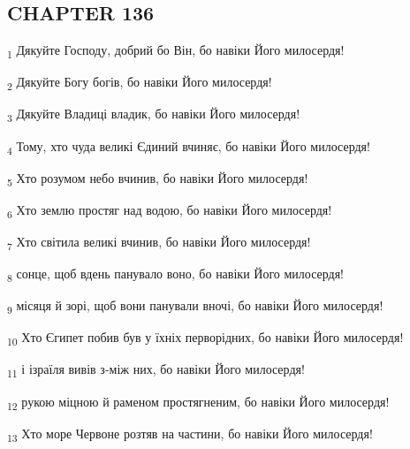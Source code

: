 \subsection{CHAPTER 136}
\begin{tcolorbox}
\textsubscript{1} Дякуйте Господу, добрий бо Він, бо навіки Його милосердя!
\end{tcolorbox}
\begin{tcolorbox}
\textsubscript{2} Дякуйте Богу богів, бо навіки Його милосердя!
\end{tcolorbox}
\begin{tcolorbox}
\textsubscript{3} Дякуйте Владиці владик, бо навіки Його милосердя!
\end{tcolorbox}
\begin{tcolorbox}
\textsubscript{4} Тому, хто чуда великі Єдиний вчиняє, бо навіки Його милосердя!
\end{tcolorbox}
\begin{tcolorbox}
\textsubscript{5} Хто розумом небо вчинив, бо навіки Його милосердя!
\end{tcolorbox}
\begin{tcolorbox}
\textsubscript{6} Хто землю простяг над водою, бо навіки Його милосердя!
\end{tcolorbox}
\begin{tcolorbox}
\textsubscript{7} Хто світила великі вчинив, бо навіки Його милосердя!
\end{tcolorbox}
\begin{tcolorbox}
\textsubscript{8} сонце, щоб вдень панувало воно, бо навіки Його милосердя!
\end{tcolorbox}
\begin{tcolorbox}
\textsubscript{9} місяця й зорі, щоб вони панували вночі, бо навіки Його милосердя!
\end{tcolorbox}
\begin{tcolorbox}
\textsubscript{10} Хто Єгипет побив був у їхніх перворідних, бо навіки Його милосердя!
\end{tcolorbox}
\begin{tcolorbox}
\textsubscript{11} і ізраїля вивів з-між них, бо навіки Його милосердя!
\end{tcolorbox}
\begin{tcolorbox}
\textsubscript{12} рукою міцною й раменом простягненим, бо навіки Його милосердя!
\end{tcolorbox}
\begin{tcolorbox}
\textsubscript{13} Хто море Червоне розтяв на частини, бо навіки Його милосердя!
\end{tcolorbox}
